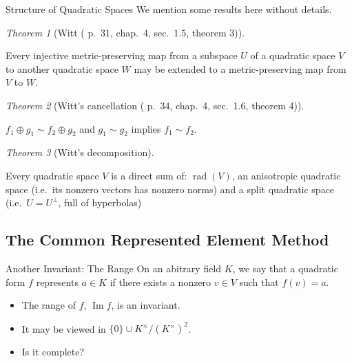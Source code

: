 \documentclass[fontset=fandol,envcountsect]{ctexbeamer}
\theoremstyle{theorem}
\newtheorem{theorem}{定理}
\theoremstyle{example}
\theoremstyle{remark}
\theoremstyle{theorem}
\newtheorem{theorem}{Theorem}
\theoremstyle{example}
\theoremstyle{remark}
\newcommand{\myemph}[1]{{\usebeamercolor[fg]{structure} #1}}
\renewcommand{\emph}{\myemph}
\begin{document}
\begin{frame}{Structure of Quadratic Spaces}
\label{structure-of-quadratic-spaces}
We mention some results here without details.

\begin{theorem}[Witt (\autocite{serre_course_1973} p.~31, chap.~4,
sec.~1.5, theorem 3)]\protect\hypertarget{thm-witt}{}\label{thm-witt}

Every injective metric-preserving map from a subspace \(U\) of a
quadratic space \(V\) to another quadratic space \(W\) may be extended
to a metric-preserving map from \(V\) to \(W\).

\end{theorem}

\begin{theorem}[Witt's cancellation (\autocite{serre_course_1973} p.~34,
chap.~4, sec.~1.6, theorem
4)]\protect\hypertarget{thm-witt-cancel}{}\label{thm-witt-cancel}

\(f_1 \oplus g_1 \sim f_2 \oplus g_2\) and \(g_1 \sim g_2\) implies
\(f_1 \sim f_2\).

\end{theorem}

\begin{theorem}[Witt's
decomposition]\protect\hypertarget{thm-witt-decomposition}{}\label{thm-witt-decomposition}

Every quadratic space \(V\) is a direct sum of:
\(\operatorname{rad}(V)\), an anisotropic quadratic space (i.e.~its
nonzero vectors has nonzero norms) and a split quadratic space
(i.e.~\(U = U^\perp\), full of hyperbolas)

\end{theorem}
\end{frame}

\subsection{The Common Represented Element
Method}\label{the-common-represented-element-method}

\begin{frame}{Another Invariant: The Range}
\label{another-invariant-the-range}
On an abitrary field \(K\), we say that a quadratic form \(f\)
\emph{represent}s \(a \in K\) if there exists a nonzero \(v \in V\) such
that \(f(v) = a\).

\begin{itemize}
\item
  The range of \(f\), \(\operatorname{Im}f\), is an invariant.
\item
  It may be viewed in \(\{0\} \cup K^\times / (K^{\times})^2\).
\item
  Is it complete?
\end{itemize}
\end{frame}
\end{document}
